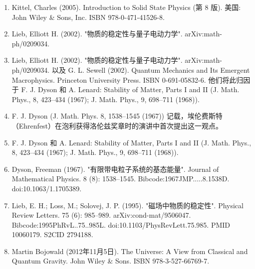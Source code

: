 \begin{enumerate}
\item Kittel, Charles (2005). Introduction to Solid State Physics (第 8 版). 美国: John Wiley & Sons, Inc. ISBN 978-0-471-41526-8.  
\item Lieb, Elliott H. (2002). "物质的稳定性与量子电动力学". arXiv:math-ph/0209034.  
\item Lieb, Elliott H. (2002). "物质的稳定性与量子电动力学". arXiv:math-ph/0209034. 以及 G. L. Sewell (2002). Quantum Mechanics and Its Emergent Macrophysics. Princeton University Press. ISBN 0-691-05832-6. 他们将此归因于 F. J. Dyson 和 A. Lenard: Stability of Matter, Parts I and II (J. Math. Phys., 8, 423–434 (1967); J. Math. Phys., 9, 698–711 (1968)).  
\item F. J. Dyson (J. Math. Phys. 8, 1538–1545 (1967)) 记载，埃伦费斯特（Ehrenfest）在泡利获得洛伦兹奖章时的演讲中首次提出这一观点。  
\item F. J. Dyson 和 A. Lenard: Stability of Matter, Parts I and II (J. Math. Phys., 8, 423–434 (1967); J. Math. Phys., 9, 698–711 (1968)).  
\item Dyson, Freeman (1967). "有限带电粒子系统的基态能量". Journal of Mathematical Physics. 8 (8): 1538–1545. Bibcode:1967JMP.....8.1538D. doi:10.1063/1.1705389.  
\item Lieb, E. H.; Loss, M.; Solovej, J. P. (1995). "磁场中物质的稳定性". Physical Review Letters. 75 (6): 985–989. arXiv:cond-mat/9506047. Bibcode:1995PhRvL..75..985L. doi:10.1103/PhysRevLett.75.985. PMID 10060179. S2CID 2794188.  
\item Martin Bojowald (2012年11月5日). The Universe: A View from Classical and Quantum Gravity. John Wiley & Sons. ISBN 978-3-527-66769-7.
\end{enumerate}